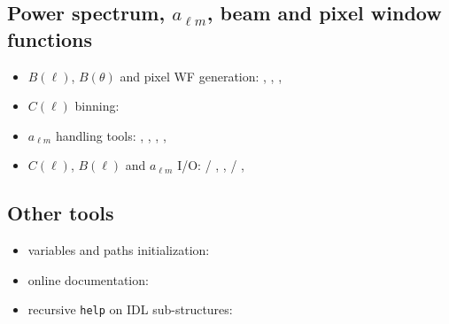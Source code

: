 \subsection[Power spectrum, alm, beam and pixel window functions]{Power spectrum, $a_{\ell m}$, beam and pixel window functions}
\begin{itemize}
%
\item $B(\ell)$, $B(\theta)$ and pixel WF generation:
,
,
,
%
\item $C(\ell)$ binning:
%
\item $a_{\ell m}$ handling tools:
,
,
,
,
%
\item $C(\ell)$, $B(\ell)$ and $a_{\ell m}$ I/O:
/%
,
,
/%
,
%
\end{itemize}

\subsection{Other tools}
\begin{itemize}
\item \healpix variables and paths initialization: 
\item online documentation: 
\item recursive \texttt{help} on IDL sub-structures: 
\end{itemize}


%  
% 
% 

